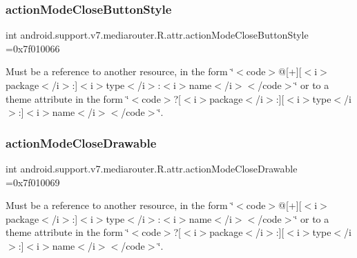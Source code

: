\subsubsection{\texorpdfstring{action\+Mode\+Close\+Button\+Style}{actionModeCloseButtonStyle}}
{\footnotesize\ttfamily int android.\+support.\+v7.\+mediarouter.\+R.\+attr.\+action\+Mode\+Close\+Button\+Style =0x7f010066\hspace{0.3cm}{\ttfamily [static]}}

Must be a reference to another resource, in the form \char`\"{}$<$code$>$@\mbox{[}+\mbox{]}\mbox{[}$<$i$>$package$<$/i$>$\+:\mbox{]}$<$i$>$type$<$/i$>$\+:$<$i$>$name$<$/i$>$$<$/code$>$\char`\"{} or to a theme attribute in the form \char`\"{}$<$code$>$?\mbox{[}$<$i$>$package$<$/i$>$\+:\mbox{]}\mbox{[}$<$i$>$type$<$/i$>$\+:\mbox{]}$<$i$>$name$<$/i$>$$<$/code$>$\char`\"{}. \mbox{\label{classandroid_1_1support_1_1v7_1_1mediarouter_1_1R_1_1attr_aaa8a7a9c18f17e580e78c69029259bf4}} 
\subsubsection{\texorpdfstring{action\+Mode\+Close\+Drawable}{actionModeCloseDrawable}}
{\footnotesize\ttfamily int android.\+support.\+v7.\+mediarouter.\+R.\+attr.\+action\+Mode\+Close\+Drawable =0x7f010069\hspace{0.3cm}{\ttfamily [static]}}

Must be a reference to another resource, in the form \char`\"{}$<$code$>$@\mbox{[}+\mbox{]}\mbox{[}$<$i$>$package$<$/i$>$\+:\mbox{]}$<$i$>$type$<$/i$>$\+:$<$i$>$name$<$/i$>$$<$/code$>$\char`\"{} or to a theme attribute in the form \char`\"{}$<$code$>$?\mbox{[}$<$i$>$package$<$/i$>$\+:\mbox{]}\mbox{[}$<$i$>$type$<$/i$>$\+:\mbox{]}$<$i$>$name$<$/i$>$$<$/code$>$\char`\"{}. \mbox{\label{classandroid_1_1support_1_1v7_1_1mediarouter_1_1R_1_1attr_ae86be6b245df77092069eab5783ebd50}} 

